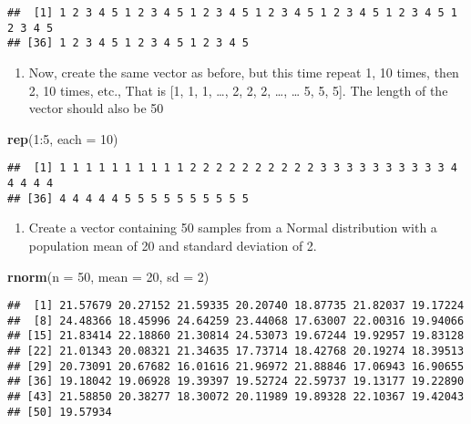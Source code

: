 \documentclass[]{book}
\newenvironment{Shaded}{\begin{snugshade}}{\end{snugshade}}
\newcommand{\KeywordTok}[1]{\textcolor[rgb]{0.13,0.29,0.53}{\textbf{{#1}}}}
\newcommand{\DataTypeTok}[1]{\textcolor[rgb]{0.13,0.29,0.53}{{#1}}}
\newcommand{\DecValTok}[1]{\textcolor[rgb]{0.00,0.00,0.81}{{#1}}}
\newcommand{\NormalTok}[1]{{#1}}
\providecommand{\tightlist}{%
  \setlength{\itemsep}{0pt}\setlength{\parskip}{0pt}}
\begin{document}
\begin{verbatim}
##  [1] 1 2 3 4 5 1 2 3 4 5 1 2 3 4 5 1 2 3 4 5 1 2 3 4 5 1 2 3 4 5 1 2 3 4 5
## [36] 1 2 3 4 5 1 2 3 4 5 1 2 3 4 5
\end{verbatim}

\begin{enumerate}
\def\labelenumi{\arabic{enumi}.}
\setcounter{enumi}{6}
\tightlist
\item
  Now, create the same vector as before, but this time repeat 1, 10
  times, then 2, 10 times, etc., That is {[}1, 1, 1, \ldots{}, 2, 2, 2,
  \ldots{}, \ldots{} 5, 5, 5{]}. The length of the vector should also be
  50
\end{enumerate}

\begin{Shaded}
\begin{Highlighting}[]
\KeywordTok{rep}\NormalTok{(}\DecValTok{1}\NormalTok{:}\DecValTok{5}\NormalTok{, }\DataTypeTok{each =} \DecValTok{10}\NormalTok{)}
\end{Highlighting}
\end{Shaded}

\begin{verbatim}
##  [1] 1 1 1 1 1 1 1 1 1 1 2 2 2 2 2 2 2 2 2 2 3 3 3 3 3 3 3 3 3 3 4 4 4 4 4
## [36] 4 4 4 4 4 5 5 5 5 5 5 5 5 5 5
\end{verbatim}

\begin{enumerate}
\def\labelenumi{\arabic{enumi}.}
\setcounter{enumi}{7}
\tightlist
\item
  Create a vector containing 50 samples from a Normal distribution with
  a population mean of 20 and standard deviation of 2.
\end{enumerate}

\begin{Shaded}
\begin{Highlighting}[]
\KeywordTok{rnorm}\NormalTok{(}\DataTypeTok{n =} \DecValTok{50}\NormalTok{, }\DataTypeTok{mean =} \DecValTok{20}\NormalTok{, }\DataTypeTok{sd =} \DecValTok{2}\NormalTok{)}
\end{Highlighting}
\end{Shaded}

\begin{verbatim}
##  [1] 21.57679 20.27152 21.59335 20.20740 18.87735 21.82037 19.17224
##  [8] 24.48366 18.45996 24.64259 23.44068 17.63007 22.00316 19.94066
## [15] 21.83414 22.18860 21.30814 24.53073 19.67244 19.92957 19.83128
## [22] 21.01343 20.08321 21.34635 17.73714 18.42768 20.19274 18.39513
## [29] 20.73091 20.67682 16.01616 21.96972 21.88846 17.06943 16.90655
## [36] 19.18042 19.06928 19.39397 19.52724 22.59737 19.13177 19.22890
## [43] 21.58850 20.38277 18.30072 20.11989 19.89328 22.10367 19.42043
## [50] 19.57934
\end{verbatim}
\end{document}
